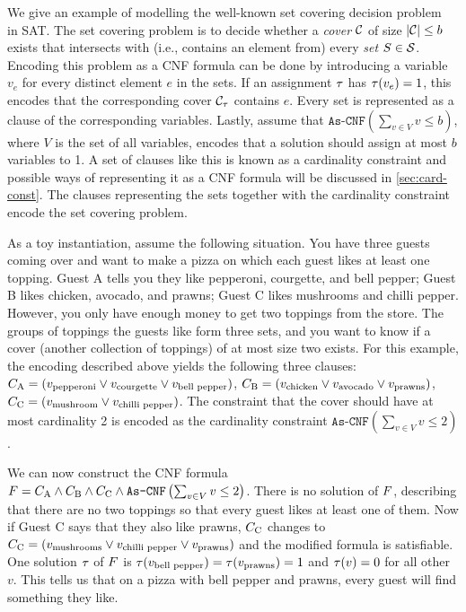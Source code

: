 \begin{example}\label{ex:sat-modelling}
  We give an example of modelling the well-known set covering decision problem~\autocite{DBLP:conf/coco/Karp72} in SAT.
  The set covering problem is to decide whether a \emph{cover} $\mathcal{C}$ of size $|\mathcal{C}|\le b$ exists that intersects with (i.e., contains an element from) every \emph{set} $S \in \mathcal{S}$.
  Encoding this problem as a CNF formula can be done by introducing a variable $v_e$ for every distinct element $e$ in the sets.
  If an assignment $\tau$ has $\tau(v_e)=1$, this encodes that the corresponding cover $\mathcal{C}_\tau$ contains $e$.
  Every set is represented as a clause of the corresponding variables.
  Lastly, assume that $\texttt{As-CNF}\left(\sum_{v \in V} v \le b\right)$, where $V$ is the set of all variables, encodes that a solution should assign at most $b$ variables to 1.
  A set of clauses like this is known as a cardinality constraint and possible ways of representing it as a CNF formula will be discussed in \cref{sec:card-const}.
  The clauses representing the sets together with the cardinality constraint encode the set covering problem.

  As a toy instantiation, assume the following situation.
  You have three guests coming over and want to make a pizza on which each guest likes at least one topping.
  Guest A tells you they like pepperoni, courgette, and bell pepper;
  Guest B likes chicken, avocado, and prawns;
  Guest C likes mushrooms and chilli pepper.
  However, you only have enough money to get two toppings from the store.
  The groups of toppings the guests like form three sets, and you want to know if a cover (another collection of toppings) of at most size two exists.
  For this example, the encoding described above yields the following three clauses:
  $C_\text{A} = (v_\text{pepperoni} \lor v_\text{courgette} \lor v_\text{bell pepper})$, $C_\text{B} = (v_\text{chicken} \lor v_\text{avocado} \lor v_\text{prawns})$, $C_\text{C} = (v_\text{mushroom} \lor v_\text{chilli pepper})$.
  The constraint that the cover should have at most cardinality 2 is encoded as the cardinality constraint $\texttt{As-CNF}\left(\sum_{v \in V} v \le 2\right)$.

  We can now construct the CNF formula $F = C_\text{A} \allowbreak \land C_\text{B} \allowbreak \land C_\text{C} \allowbreak \land \texttt{As-CNF}\left(\sum_{v \in V} v \le 2\right)$.
  There is no solution of $F$, describing that there are no two toppings so that every guest likes at least one of them.
  Now if Guest C says that they also like prawns, $C_\text{C}$ changes to $C_\text{C} = (v_\text{mushrooms} \lor v_\text{chilli pepper} \lor v_\text{prawns})$ and the modified formula is satisfiable.
  One solution $\tau$ of $F$ is $\tau(v_\text{bell pepper}) = \tau(v_\text{prawns}) = 1$ and $\tau(v) = 0$ for all other $v$.
  This tells us that on a pizza with bell pepper and prawns, every guest will find something they like.
\end{example}

